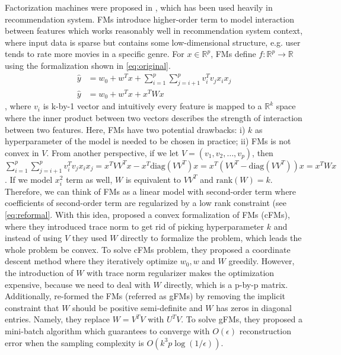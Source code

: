 \documentclass{article}
\newcommand{\diag}{\text{diag}}
\newcommand{\rank}{\text{rank}}
\begin{document}
Factorization machines were proposed in \cite{FM_paper}, which has been used heavily in recommendation system. FMs introduce higher-order term to model interaction between features which works reasonably well in recommendation system context, where input data is sparse but contains some low-dimensional structure, e.g. user tends to rate more movies in a specific genre. For $x \in \mathbb{R}^p$, FMs define $f: \mathbb{R}^p \rightarrow \mathbb{R}$ using the formalization shown in \cref{eq:original}. 
\begin{align}
  \hat{y} &= w_0 + w^T x + \sum_{i = 1}^p\sum_{j = i + 1}^p v_i^T v_j x_i x_j \label{eq:original} \\
  \hat{y} &= w_0 + w^T x + x^T W x \label{eq:reformal}
\end{align}
, where $v_i$ is k-by-1 vector and intuitively every feature is mapped to a $\mathbb{R}^k$ space where the inner product between two vectors describes the strength of interaction between two features. Here, FMs have two potential drawbacks: i) $k$ as hyperparameter of the model is needed to be chosen in practice; ii) FMs is not convex in $V$. From another perspective, if we let $V = (v_1, v_2, …, v_p)$, then $\sum_{i = 1}^p\sum_{j = i + 1}^p v_i^T v_j x_i x_j = x^T V V^T x - x^T \diag(V V^T) x = x^T (V V^T -  \diag(V V^T))  x = x^T W x$. If we model $x_i^2$ term as well, $W$ is equivalent to $VV^T$ and $\rank(W) = k$. Therefore, we can think of FMs as a linear model with second-order term where coefficients of second-order term are regularized by a low rank constraint (see \cref{eq:reformal}. With this idea, \cite{convexFM_paper} proposed a convex formalization of FMs (cFMs), where they introduced trace norm to get rid of picking hyperparameter $k$ and instead of using $V$ they used $W$ directly to formalize the problem, which leads the whole problem be convex. To solve cFMs problem, they proposed a coordinate descent method where they iteratively optimize $w_0, w$ and $W$ greedily. However, the introduction of $W$ with trace norm regularizer makes the optimization expensive, because we need to deal with $W$ directly, which is a p-by-p matrix. Additionally, \cite{generalizedFM_paper} re-formed the FMs (referred as gFMs) by removing the implicit constraint that $W$ should be positive semi-definite and $W$ has zeros in diagonal entries. Namely, they replace $W = V^TV$ with $U^TV$. To solve gFMs, they proposed a mini-batch algorithm which guarantees to converge with $O(\epsilon)$ reconstruction error when the sampling complexity is $O(k^3p \log(1/\epsilon))$. 
\end{document}
